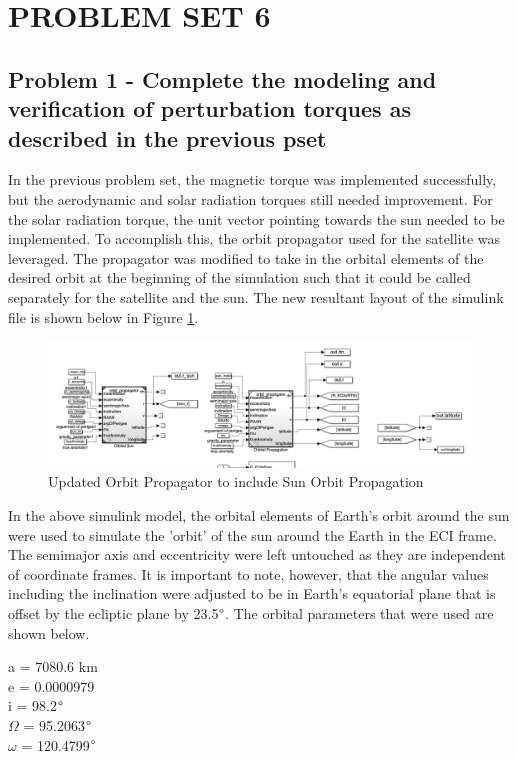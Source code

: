 \section{\Large PROBLEM SET 6}

\subsection{Problem 1 - Complete the modeling and verification of perturbation torques as described in the previous pset}

In the previous problem set, the magnetic torque was implemented successfully, but the aerodynamic and solar radiation torques still needed improvement. For the solar radiation torque, the unit vector pointing towards the sun needed to be implemented. To accomplish this, the orbit propagator used for the satellite was leveraged. The propagator was modified to take in the orbital elements of the desired orbit at the beginning of the simulation such that it could be called separately for the satellite and the sun. The new resultant layout of the simulink file is shown below in Figure \ref{fig:sun_orbit_sim}.

\begin{figure}[H]
    \centering
    \captionsetup{ justification = centering }
    \includegraphics[width = 12cm]{Images/PS6/updatedOrbitPropagatorSim.png}
    \caption{Updated Orbit Propagator to include Sun Orbit Propagation}
    \label{fig:sun_orbit_sim}
\end{figure}

In the above simulink model, the orbital elements of Earth's orbit around the sun were used to simulate the 'orbit' of the sun around the Earth in the ECI frame. The semimajor axis and eccentricity were left untouched as they are independent of coordinate frames. It is important to note, however, that the angular values including the inclination were adjusted to be in Earth's equatorial plane that is offset by the ecliptic plane by 23.5$\degree$. The orbital parameters that were used are shown below.

\begin{center}
    a = 7080.6 km \\
    e = 0.0000979 \\
    i = 98.2$\degree$ \\
    $\Omega$ = 95.2063$\degree$ \\
    $\omega$ = 120.4799$\degree$ \\
\end{center}

